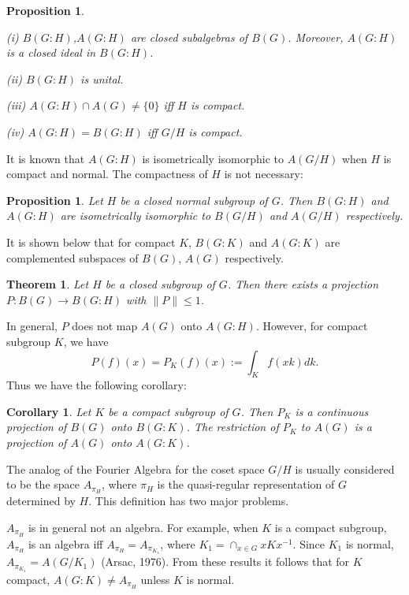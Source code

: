 \documentclass[12 pt]{article}
\newtheorem{theorem}[defn]{Theorem}
\newtheorem{prop}[defn]{Proposition}
\newtheorem{cor}[defn]{Corollary}
\begin{document}
\pagebreak
\begin{prop}
\begin{list}{}{\itemsep -4pt}
\item[(i)] $B(G:H)$,$A(G:H)$ are closed subalgebras of $B(G)$.  Moreover, $A(G:H)$ is a closed ideal in 
$B(G:H)$.
\item[(ii)] $B(G:H)$ is unital.
\item[(iii)] $A(G:H)\cap A(G) \neq \{0\}$ iff $H$ is compact.
\item[(iv)] $A(G:H) = B(G:H)$ iff $G/H$ is compact.
\end{list}
\end{prop}

It is known that $A(G:H)$ is isometrically isomorphic to $A(G/H)$ when $H$ is compact
and normal.  The compactness of $H$ is not necessary:

\begin{prop}
Let $H$ be a closed normal subgroup of $G$.  Then $B(G:H)$ and $A(G:H)$ are isometrically
isomorphic to $B(G/H)$ and $A(G/H)$ respectively.
\end{prop}

It is shown below that for compact $K$, $B(G:K)$ and $A(G:K)$ are complemented subspaces
of $B(G)$, $A(G)$ respectively.

\begin{theorem}
Let $H$ be a closed subgroup of $G$.  Then there exists a projection
$P:B(G) \rightarrow B(G:H)$ with $\|P\| \leq 1$.
\end{theorem}

In general, $P$ does not map $A(G)$ onto $A(G:H)$.  However, for compact subgroup $K$,
we have
$$
P(f)(x) = P_K (f)(x) := \int_K f(xk) dk.
$$
Thus we have the following corollary:

\begin{cor}\label{3.4}
Let $K$ be a compact subgroup of $G$.  Then $P_K$ is a continuous projection of $B(G)$ onto $B(G:K)$.
The restriction of $P_K$ to $A(G)$ is a projection of $A(G)$ onto $A(G:K)$.
\end{cor}


The analog of the Fourier Algebra for the coset space $G/H$ is usually considered to be
the space $A_{\pi_H}$, where $\pi_H$ is the quasi-regular representation of $G$ determined
by $H$.  This definition has two major problems.

\medskip
{} $A_{\pi_H}$ is in general not an algebra.
For example, when $K$ is a compact subgroup, $A_{\pi_H}$ is an algebra iff $A_{\pi_H} = A_{\pi_{K_1}}$, 
where $K_1 = \cap_{x\in G} xKx^{-1}$.  Since $K_1$ is normal, $A_{\pi_{K_1}} = A(G/K_1)$
(Arsac, 1976).  From these results it follows that for $K$ compact, $A(G:K)\neq A_{\pi_H}$
unless $K$ is normal.
\end{document}
